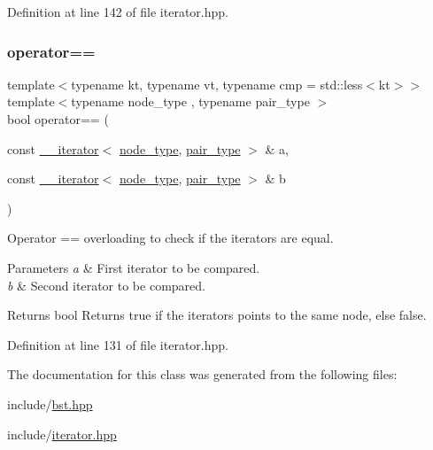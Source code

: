 Definition at line 142 of file iterator.\+hpp.

\mbox{\label{classbst_1_1____iterator_a2e5014cb825532053115734598e16318}} 
\subsubsection{\texorpdfstring{operator==}{operator==}}
{\footnotesize\ttfamily template$<$typename kt, typename vt, typename cmp = std\+::less$<$kt$>$$>$ \\
template$<$typename node\+\_\+type , typename pair\+\_\+type $>$ \\
bool operator== (\begin{DoxyParamCaption}\item[{const \hyperlink{classbst_1_1____iterator}{\+\_\+\+\_\+iterator}$<$ \hyperlink{classbst_a062eb2a1ac54802dbc4f0f74ae2afd01}{node\+\_\+type}, \hyperlink{classbst_a7b11cca2a3b4394915600194f741ab16}{pair\+\_\+type} $>$ \&}]{a,  }\item[{const \hyperlink{classbst_1_1____iterator}{\+\_\+\+\_\+iterator}$<$ \hyperlink{classbst_a062eb2a1ac54802dbc4f0f74ae2afd01}{node\+\_\+type}, \hyperlink{classbst_a7b11cca2a3b4394915600194f741ab16}{pair\+\_\+type} $>$ \&}]{b }\end{DoxyParamCaption})\hspace{0.3cm}{\ttfamily [friend]}}



Operator == overloading to check if the iterators are equal. 


\begin{DoxyParams}{Parameters}
{\em a} & First iterator to be compared. \\
\hline
{\em b} & Second iterator to be compared. \\
\hline
\end{DoxyParams}
\begin{DoxyReturn}{Returns}
bool Returns true if the iterators points to the same node, else false. 
\end{DoxyReturn}


Definition at line 131 of file iterator.\+hpp.



The documentation for this class was generated from the following files\+:\begin{DoxyCompactItemize}
\item 
include/\hyperlink{bst_8hpp}{bst.\+hpp}\item 
include/\hyperlink{iterator_8hpp}{iterator.\+hpp}\end{DoxyCompactItemize}
